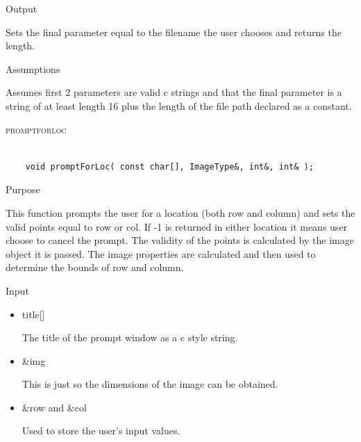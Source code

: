 \documentclass[pdftex, 11pt]{article}
\begin{document}
\begin{description}
\begin{description}
\begin{itemize}
				\end{itemize}

			\item{Output}

				Sets the final parameter equal to the filename the user
				chooses and returns the length.

			\item{Assumptions}

				Assumes first 2 parameters are valid c strings and that
				the final parameter is a string of at least length 16 plus
				the length of the file path declared as a constant.

		\end{description}



	\item{\textsc{promptforloc}}

		\begin{lstlisting}

	void promptForLoc( const char[], ImageType&, int&, int& );
		\end{lstlisting}

		\begin{description}
			\item{Purpose}

				This function prompts the user for a location (both row and column) and sets
				the valid points equal to row or col.  If -1 is returned in either location
				it means user choose to cancel the prompt.  The validity of the points is
				calculated by the image object it is passed.  The image properties are
				calculated and then used to determine the bounds of row and column.

			\item{Input}

				\begin{itemize}

					\item{title[]}

						The title of the prompt window as a c style string.

					\item{\&img}

						This is just so the dimensions of the image can be obtained.

					\item{\&row and \&col}

						Used to store the user's input values.

				\end{itemize}


\end{description}
\end{description}
\end{document}

